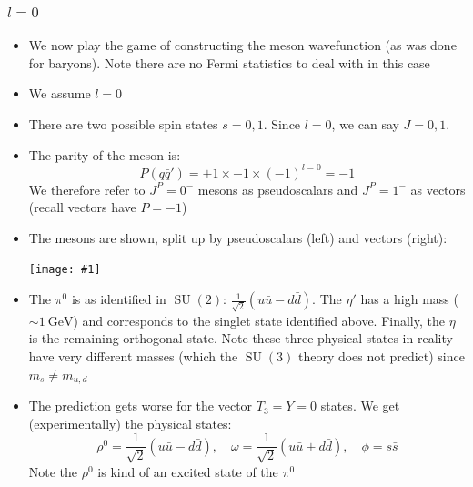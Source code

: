 \documentclass[11pt]{article}
\newcommand{\ubar}{\bar{u}}
\newcommand{\sbar}{\bar{s}}
\newcommand{\qbar}{{\bar{q}}}
\newcommand{\dbar}{\bar{d}}
\DeclareMathOperator{\SU}{SU}
\newcommand{\gev}{\text{GeV}}
\newcommand{\embedimgw}[2]{\begin{center}\texttt{[image: \#1]}\end{center}}
\begin{document}
\subsubsection{$l=0$}
\begin{itemize}
  \item We now play the game of constructing the meson wavefunction (as was done for baryons). Note there are no Fermi statistics to deal with in this case
  \item We assume $l=0$
  \item There are two possible spin states $s=0,1$. Since $l=0$, we can say $J=0,1$.
  \item The parity of the meson is:
  \begin{equation}
    P(q\qbar') = +1\times -1 \times (-1)^{l=0} = -1
  \end{equation}
  We therefore refer to $J^P = 0^-$ mesons as pseudoscalars and $J^P = 1^-$ as vectors (recall vectors have $P=-1$)
  \item The mesons are shown, split up by pseudoscalars (left) and vectors (right):
  \embedimgw{figs/mesons2.png}{.6}
  \item The $\pi^0$ is as identified in $\SU(2)$: $\frac{1}{\sqrt{2}}(u\ubar-d\dbar)$. The $\eta'$ has a high mass ($\sim1~\gev$) and corresponds to the singlet state identified above. Finally, the $\eta$ is the remaining orthogonal state. Note these three physical states in reality have very different masses (which the $\SU(3)$ theory does not predict) since $m_s \neq m_{u,d}$
  \item The prediction gets worse for the vector $T_3 = Y = 0$ states. We get (experimentally) the physical states:
  \begin{equation}
    \rho^0 = \frac{1}{\sqrt2} (u\ubar - d\dbar), \quad \omega = \frac{1}{\sqrt2}(u\ubar+d\dbar), \quad \phi = s\sbar
  \end{equation}
  Note the $\rho^0$ is kind of an excited state of the $\pi^0$
\end{itemize}
\end{document}
